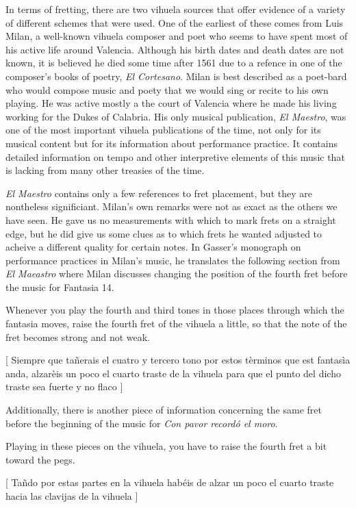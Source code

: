 In terms of fretting, there are two vihuela sources that offer evidence of a variety of
different schemes that were used. One of the
earliest of these comes from Luis Milan, a well-known vihuela composer and poet who seems
to have spent most of his
active life around Valencia.  Although his birth dates and death dates are not known, it
is believed he died some time after 1561 due to a refence in one of the composer's books of
poetry, \textit{El Cortesano}.\autocite[6]{LG:1}  Milan is best described as a poet-bard who would compose
music and poety that we would sing or recite to his own playing.  He was active mostly a the
court of Valencia where he made his living working for the Dukes of Calabria.
His only musical publication, \textit{El Maestro}, was one of the most important vihuela
publications of the time, not only for its musical content but for its information about
performance practice.  It contains detailed information on tempo and other interpretive
elements of this music that is lacking from many other treasies of the time.

\textit{El Maestro} contains only a few references to fret placement, but they are nontheless
significiant.  Milan's own remarks were not as exact as the others we have seen.  He gave us no
measurements with which to mark frets on a straight edge, but he did give us some clues as to
which frets he wanted adjusted to acheive a
different quality for certain notes.  In Gasser's monograph on performance practices in
Milan's music, he translates the following section from \textit{El Maeastro} where
Milan discusses changing the position of the fourth fret before the music for Fantasia 14.

\begin{blocks}
Whenever you play the fourth and third tones in those places through which the fantasia moves,
raise the fourth fret of the vihuela a little, so that the note of the fret becomes strong
and not weak.

[ Siempre que ta\~{n}erais el cuatro y tercero tono por estos t\`{e}rminos que est fantas\`{i}a
anda, alzar\`{e}is un poco el cuarto traste de la vihuela para que el punto del dicho traste
sea fuerte y no flaco ]\autocite[156]{LG:1}
\end{blocks}

Additionally, there is another piece of information concerning the same fret before the
beginning of the music for \textit{Con pavor record\'{o} el moro}.

\begin{blocks}
Playing in these pieces on the vihuela, you have to raise the fourth fret a bit toward the pegs.

[ Ta\~{n}do por estas partes en la vihuela hab\'{e}is de alzar un poco el cuarto traste hacia las
clavijas de la vihuela ]\autocite[156]{LG:1}
\end{blocks}

